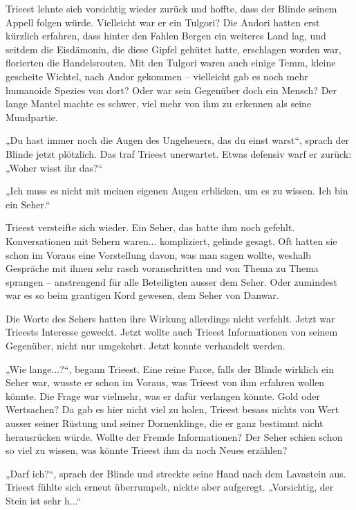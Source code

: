 Trieest lehnte sich vorsichtig wieder zurück und hoffte, dass der Blinde seinem Appell folgen würde. Vielleicht war er ein Tulgori? Die Andori hatten erst kürzlich erfahren, dass hinter den Fahlen Bergen ein weiteres Land lag, und seitdem die Eisdämonin, die diese Gipfel gehütet hatte, erschlagen worden war, florierten die Handelsrouten. Mit den Tulgori waren auch einige Temm, kleine gescheite Wichtel, nach Andor gekommen – vielleicht gab es noch mehr humanoide Spezies von dort? Oder war sein Gegenüber doch ein Mensch? Der lange Mantel machte es schwer, viel mehr von ihm zu erkennen als seine Mundpartie.\bigskip



„Du hast immer noch die Augen des Ungeheuers, das du einst warst“, sprach der Blinde jetzt plötzlich. Das traf Trieest unerwartet. Etwas defensiv warf er zurück: „Woher wisst ihr das?“

„Ich muss es nicht mit meinen eigenen Augen erblicken, um es zu wissen. Ich bin ein Seher.“

Trieest versteifte sich wieder. Ein Seher, das hatte ihm noch gefehlt. Konversationen mit Sehern waren... kompliziert, gelinde gesagt. Oft hatten sie schon im Voraus eine Vorstellung davon, was man sagen wollte, weshalb Gespräche mit ihnen sehr rasch voranschritten und von Thema zu Thema sprangen – anstrengend für alle Beteiligten ausser dem Seher. Oder zumindest war es so beim grantigen Kord gewesen, dem Seher von Danwar.

Die Worte des Sehers hatten ihre Wirkung allerdings nicht verfehlt. Jetzt war Trieests Interesse geweckt. Jetzt wollte auch Trieest Informationen von seinem Gegenüber, nicht nur umgekehrt. Jetzt konnte verhandelt werden.\bigskip



„Wie lange...?“, begann Trieest. Eine reine Farce, falls der Blinde wirklich ein Seher war, wusste er schon im Voraus, was Trieest von ihm erfahren wollen könnte. Die Frage war vielmehr, was er dafür verlangen könnte. Gold oder Wertsachen? Da gab es hier nicht viel zu holen, Trieest besass nichts von Wert ausser seiner Rüstung und seiner Dornenklinge, die er ganz bestimmt nicht herausrücken würde. Wollte der Fremde Informationen? Der Seher schien schon so viel zu wissen, was könnte Trieest ihm da noch Neues erzählen?

„Darf ich?“, sprach der Blinde und streckte seine Hand nach dem Lavastein aus. Trieest fühlte sich erneut überrumpelt, nickte aber aufgeregt. „Vorsichtig, der Stein ist sehr h...“

